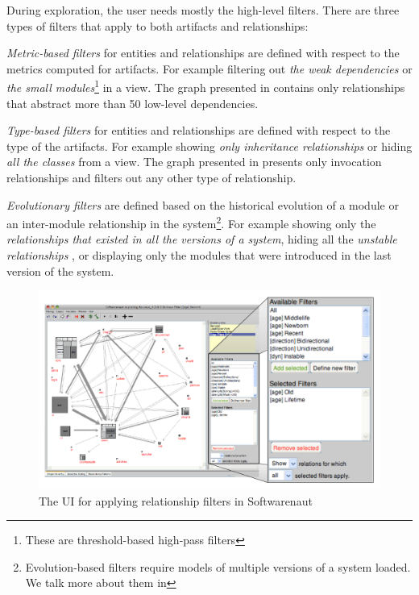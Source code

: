 \documentclass[preprint,12pt]{elsarticle}
\begin{document}
During exploration, the user needs mostly the high-level filters. There are three types of filters that apply to both artifacts and relationships: 

\begin{description}
\item {\em Metric-based filters} for entities and relationships are defined with respect to the metrics computed for artifacts. For example filtering out {\em the weak dependencies} or {\em the small modules}\footnote{These are threshold-based high-pass filters} in a view. The graph presented in  contains only relationships that abstract more than 50 low-level dependencies.

\item {\em Type-based filters} for entities and relationships are defined with respect to the type of the artifacts. For example showing {\em only inheritance relationships} or hiding {\em all the classes} from a view. The graph presented in  presents only invocation relationships and filters out any other type of relationship.

\item {\em Evolutionary filters} are defined based on the historical evolution of a module or an inter-module relationship in the system\footnote{Evolution-based filters require models of multiple versions of a system loaded. We talk more about them in }. For example showing only the {\em relationships that existed in all the versions of a system}, hiding all the {\em unstable relationships} \cite{lungu-relevo}, or displaying only the modules that were introduced in the last version of the system.
\end{description}

\begin{figure}[ht]
\begin{center}
\includegraphics[width=\linewidth]{SnautFilteringPanel}
\caption{The UI for applying relationship filters in Softwarenaut}
\end{center}
\end{figure}
\end{document}
